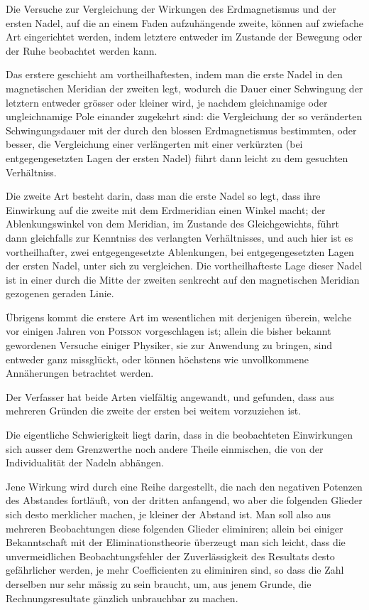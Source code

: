 \documentclass[12pt,a4paper]{article}
\begin{document}
\bigskip

Die Versuche zur Vergleichung der Wirkungen des Erdmagnetismus und der ersten Nadel, auf die an einem Faden aufzuhängende zweite, können auf zwiefache Art eingerichtet werden, indem letztere entweder im Zustande der Bewegung oder der Ruhe beobachtet werden kann.

Das erstere geschieht am vortheilhaftesten, indem man die erste Nadel in den magnetischen Meridian der zweiten legt, wodurch die Dauer einer Schwingung der letztern entweder grösser oder kleiner wird, je nachdem gleichnamige oder ungleichnamige Pole einander zugekehrt sind: die Vergleichung der so veränderten Schwingungsdauer mit der durch den blossen Erdmagnetismus bestimmten, oder besser, die Vergleichung einer verlängerten mit einer verkürzten (bei entgegengesetzten Lagen der ersten Nadel) führt dann leicht zu dem gesuchten Verhältniss.

Die zweite Art besteht darin, dass man die erste Nadel so legt, dass ihre Einwirkung auf die zweite mit dem Erdmeridian einen Winkel macht; der Ablenkungswinkel von dem Meridian, im Zustande des Gleichgewichts, führt dann gleichfalls zur Kenntniss des verlangten Verhältnisses, und auch hier ist es vortheilhafter, zwei entgegengesetzte Ablenkungen, bei entgegengesetzten Lagen der ersten Nadel, unter sich zu vergleichen. Die vortheilhafteste Lage dieser Nadel ist in einer durch die Mitte der zweiten senkrecht auf den magnetischen Meridian gezogenen geraden Linie.

Übrigens kommt die erstere Art im wesentlichen mit derjenigen überein, welche vor einigen Jahren von \textsc{Poisson} vorgeschlagen ist; allein die bisher bekannt gewordenen Versuche einiger Physiker, sie zur Anwendung zu bringen, sind entweder ganz missglückt, oder können höchstens wie unvollkommene Annäherungen betrachtet werden.

Der Verfasser hat beide Arten vielfältig angewandt, und gefunden, dass aus mehreren Gründen die zweite der ersten bei weitem vorzuziehen ist.

Die eigentliche Schwierigkeit liegt darin, dass in die beobachteten Einwirkungen sich ausser dem Grenzwerthe noch andere Theile einmischen, die von der Individualität der Nadeln abhängen.

Jene Wirkung wird durch eine Reihe dargestellt, die nach den negativen Potenzen des Abstandes fortläuft, von der dritten anfangend, wo aber die folgenden Glieder sich desto merklicher machen, je kleiner der Abstand ist. Man soll also aus mehreren Beobachtungen diese folgenden Glieder eliminiren; allein bei einiger Bekanntschaft mit der Eliminationstheorie überzeugt man sich leicht, dass die unvermeidlichen Beobachtungsfehler der Zuverlässigkeit des Resultats desto gefährlicher werden, je mehr Coefficienten zu eliminiren sind, so dass die Zahl derselben nur sehr mässig zu sein braucht, um, aus jenem Grunde, die Rechnungsresultate gänzlich unbrauchbar zu machen.
\end{document}
